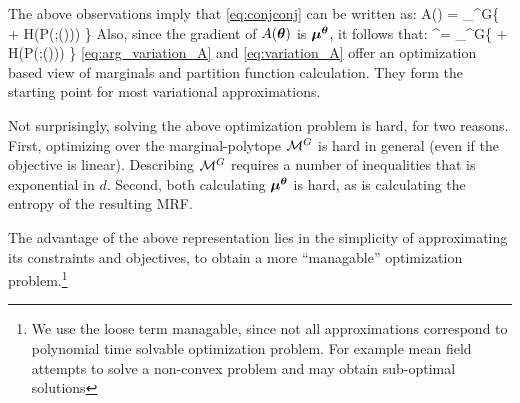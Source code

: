The above observations imply that \eqref{eq:conjconj} can be written as:
\be
A(\thetav) = \sup_{\muv \in \margpoly^G}\left \{ \muv \cdot \thetav + H(P(\xx;\thetav(\muv))) \right\} \label{eq:variation_A} 
\ee
Also, since the gradient of $A(\boldsymbol{\theta})$ is $\boldsymbol{\mu}^{\boldsymbol{\theta}}$, it follows that:
\be
\muv^{\thetav}= \arg \sup_{\muv \in \margpoly^G}\left \{ \muv \cdot \thetav + H(P(\xx;\thetav(\muv))) \right\} \label{eq:arg_variation_A}
\ee
\eqref{eq:arg_variation_A} and \eqref{eq:variation_A} offer an optimization based view of marginals and partition function calculation. They form the starting point for most
variational approximations.


Not surprisingly, solving the above optimization problem is hard, for two reasons. First,  optimizing over the marginal-polytope ${\cal{M}}^G$ is hard in general (even if the objective is linear). Describing ${\cal{M}}^G$ requires a number of inequalities that is exponential in $d$.  Second, both calculating $\boldsymbol{\mu}^{\boldsymbol{\theta}}$ is hard, as is calculating the entropy of the resulting MRF.

The advantage of the above representation lies in the simplicity of approximating its constraints and objectives, to obtain a more ``managable'' optimization problem.\footnote{We use the loose term managable, since not all approximations correspond to polynomial time solvable optimization problem. For example mean field attempts to solve a non-convex problem and may obtain sub-optimal solutions}

